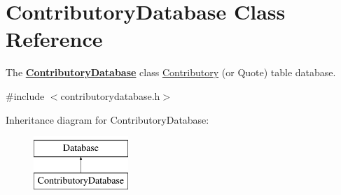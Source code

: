 \hypertarget{classContributoryDatabase}{\section{Contributory\+Database Class Reference}
\label{classContributoryDatabase}
}


The {\bfseries \hyperlink{classContributoryDatabase}{Contributory\+Database}} class \hyperlink{classContributory}{Contributory} (or Quote) table database.  




{\ttfamily \#include $<$contributorydatabase.\+h$>$}

Inheritance diagram for Contributory\+Database\+:\begin{figure}[H]
\begin{center}
\leavevmode
\includegraphics[height=2.000000cm]{d6/d06/classContributoryDatabase}
\end{center}
\end{figure}
